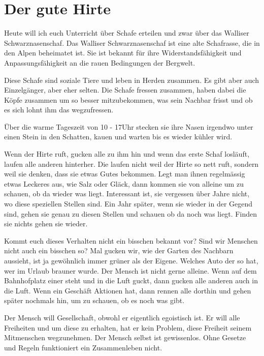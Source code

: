 \section{Der gute Hirte}

\begin{otsblock}[Einführung]
    Heute will ich euch Unterricht über Schafe erteilen und zwar über das Walliser Schwarznasenschaf. Das Walliser Schwarznasenschaf ist eine alte Schafrasse, die in den Alpen beheimatet ist. Sie ist bekannt für ihre Widerstandsfähigkeit und Anpassungsfähigkeit an die rauen Bedingungen der Bergwelt.

    Diese Schafe sind soziale Tiere und leben in Herden zusammen. Es gibt aber auch Einzelgänger, aber eher selten. Die Schafe fressen zusammen, haben dabei die Köpfe zusammen um so besser mitzubekommen, was sein Nachbar frisst und ob es sich lohnt ihm das wegzufressen.

    Über die warme Tageszeit von 10 - 17Uhr stecken sie ihre Nasen irgendwo unter einen Stein in den Schatten, kauen und warten bis es wieder kühler wird.

    Wenn der Hirte ruft, gucken alle zu ihm hin und wenn das erste Schaf losläuft, laufen alle anderen hinterher. Die laufen nicht weil der Hirte so nett ruft, sondern weil sie denken, dass sie etwas Gutes bekommen. Legt man ihnen regelmässig etwas Leckeres aus, wie Salz oder Gläck, dann kommen sie von alleine um zu schauen, ob da wieder was liegt. Interessant ist, sie vergessen über Jahre nicht, wo diese speziellen Stellen sind. Ein Jahr später, wenn sie wieder in der Gegend sind, gehen sie genau zu diesen Stellen und schauen ob da noch was liegt. Finden sie nichts gehen sie wieder.

    Kommt euch dieses Verhalten nicht ein bisschen bekannt vor? Sind wir Menschen nicht auch ein bisschen so? Mal gucken wir, wie der Garten des Nachbarn aussieht, ist ja gewöhnlich immer grüner als der Eigene. Welches Auto der so hat, wer im Urlaub brauner wurde. Der Mensch ist nicht gerne alleine. Wenn auf dem Bahnhofplatz einer steht und in die Luft guckt, dann gucken alle anderen auch in die Luft. Wenn ein Geschäft Aktionen hat, dann rennen alle dorthin und gehen später nochmals hin, um zu schauen, ob es noch was gibt.
    
    Der Mensch will Gesellschaft, obwohl er eigentlich egoistisch ist. Er will alle Freiheiten und um diese zu erhalten, hat er kein Problem, diese Freiheit seinem Mitmenschen wegzunehmen. Der Mensch selbst ist gewissenlos. Ohne Gesetze und Regeln funktioniert ein Zusammenleben nicht.


\end{otsblock}
